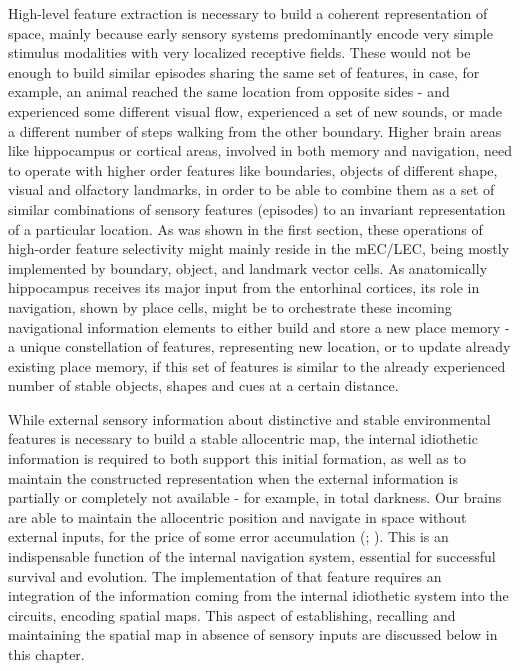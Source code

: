 High-level feature extraction is necessary to build a coherent representation of space, mainly because early sensory systems predominantly encode very simple stimulus modalities with very localized receptive fields. These would not be enough to build similar episodes sharing the same set of features, in case, for example, an animal reached the same location from opposite sides - and  experienced some different visual flow, experienced a set of new sounds, or made a different number of steps walking from the other boundary. Higher brain areas like hippocampus or cortical areas, involved in both memory and navigation, need to operate with higher order features like boundaries, objects of different shape, visual and olfactory landmarks, in order to be able to combine them as a set of similar combinations of sensory features (episodes) to an invariant representation of a particular location. As was shown in the first section, these operations of high-order feature selectivity might mainly reside in the mEC/LEC, being mostly implemented by boundary, object, and landmark vector cells. As anatomically hippocampus receives its major input from the entorhinal cortices, its role in navigation, shown by place cells, might be to orchestrate these incoming navigational information elements to either build and store a new place memory - a unique constellation of features, representing new location, or to update already existing place memory, if this set of features is similar to the already experienced number of stable objects, shapes and cues at a certain distance.

While external sensory information about distinctive and stable environmental features is necessary to build a stable allocentric map, the internal idiothetic information is required to both support this initial formation, as well as to maintain the constructed representation when the external information is partially or completely not available - for example, in total darkness. Our brains are able to maintain the allocentric position and navigate in space without external inputs, for the price of some error accumulation (\cite{Etienne1988}; \cite{Etienne2004a}). This is an indispensable function of the internal navigation system, essential for successful survival and evolution. The implementation of that feature requires an integration of the information coming from the internal idiothetic system into the circuits, encoding spatial maps. This aspect of establishing, recalling and maintaining the spatial map in absence of sensory inputs are discussed below in this chapter.


